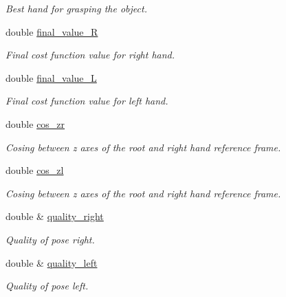 \begin{DoxyCompactItemize}
\begin{DoxyCompactList}\small\item\em Best hand for grasping the object. \end{DoxyCompactList}\item 
double \hyperlink{classGraspComputation_a7e6cc9e8ace1461121684bcf4c58e3b2}{final\+\_\+value\+\_\+R}\label{classGraspComputation_a7e6cc9e8ace1461121684bcf4c58e3b2}

\begin{DoxyCompactList}\small\item\em Final cost function value for right hand. \end{DoxyCompactList}\item 
double \hyperlink{classGraspComputation_a1a54cde3bbdd7d348f70b3e5ccfaf563}{final\+\_\+value\+\_\+L}\label{classGraspComputation_a1a54cde3bbdd7d348f70b3e5ccfaf563}

\begin{DoxyCompactList}\small\item\em Final cost function value for left hand. \end{DoxyCompactList}\item 
double \hyperlink{classGraspComputation_ac4b645e6f6d6518e933dde2a1c71b126}{cos\+\_\+zr}\label{classGraspComputation_ac4b645e6f6d6518e933dde2a1c71b126}

\begin{DoxyCompactList}\small\item\em Cosing between z axes of the root and right hand reference frame. \end{DoxyCompactList}\item 
double \hyperlink{classGraspComputation_ad6f8257369925e1676f53949717d37d6}{cos\+\_\+zl}\label{classGraspComputation_ad6f8257369925e1676f53949717d37d6}

\begin{DoxyCompactList}\small\item\em Cosing between z axes of the root and right hand reference frame. \end{DoxyCompactList}\item 
double \& \hyperlink{classGraspComputation_a6977630d0dd9437634e22a3b7d71f126}{quality\+\_\+right}\label{classGraspComputation_a6977630d0dd9437634e22a3b7d71f126}

\begin{DoxyCompactList}\small\item\em Quality of pose right. \end{DoxyCompactList}\item 
double \& \hyperlink{classGraspComputation_ab55d63b760c5519cd9434aa143a8efbb}{quality\+\_\+left}\label{classGraspComputation_ab55d63b760c5519cd9434aa143a8efbb}

\begin{DoxyCompactList}\small\item\em Quality of pose left. \end{DoxyCompactList}\end{DoxyCompactItemize}
